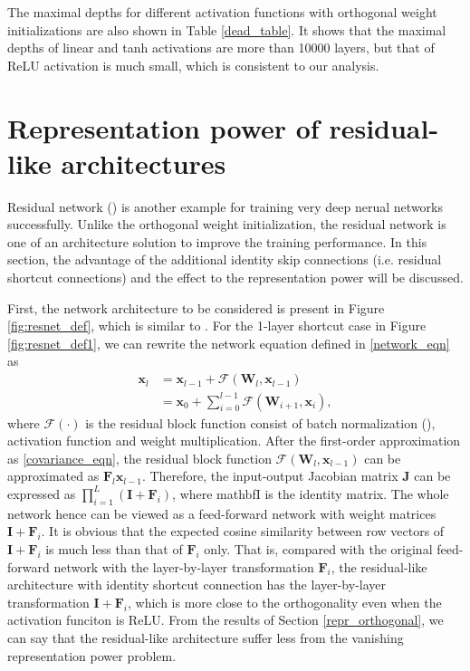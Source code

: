 The maximal depths for different activation functions with orthogonal weight initializations
are also shown in Table \ref{dead_table}. It shows that the maximal depths of linear and tanh
activations are more than 10000 layers, but that of ReLU activation is much small, which is
consistent to our analysis.

\section{Representation power of residual-like architectures} \label{repr_residual}

Residual network (\cite{resnet1, resnet2}) is another example for training very deep nerual
networks successfully.
Unlike the orthogonal weight initialization, the residual network is one of an architecture
solution to improve the training performance. In this section, the advantage of the 
additional identity skip connections (i.e. residual shortcut connections) and the effect
to the representation power will be discussed.

First, the network architecture to be considered is present in Figure \ref{fig:resnet_def}, which is
similar to \cite{resnet2}. For the 1-layer shortcut case in Figure \ref{fig:resnet_def1}, we can
rewrite the network equation defined in \eqref{network_eqn} as
\begin{equation}
    \begin{aligned}
        \mathbf{x}_{l}&=\mathbf{x}_{l-1} + \mathcal{F}(\mathbf{W}_l, \mathbf{x}_{l-1})\\
        &=\mathbf{x}_{0} + \sum_{i=0}^{l-1}\mathcal{F}(\mathbf{W}_{i+1}, \mathbf{x}_{i}),
    \end{aligned}
\label{resnet_eqn}
\end{equation}
where $\mathcal{F}(\cdot)$ is the residual block function consist of batch normalization
(\cite{batchnorm}), activation function and weight multiplication.
After the first-order approximation as \eqref{covariance_eqn}, the residual block function
$\mathcal{F}(\mathbf{W}_l, \mathbf{x}_{l-1})$ can be approximated as $\mathbf{F}_l\mathbf{x}_{l-1}$.
Therefore, the input-output Jacobian matrix $\mathbf{J}$ can be expressed as
$\prod_{i=1}^{L}(\mathbf{I}+\mathbf{F}_i)$, where mathbf{I} is the identity matrix.
The whole network hence can be viewed as a feed-forward network with weight matrices
$\mathbf{I}+\mathbf{F}_i$. It is obvious that the expected cosine similarity between row vectors 
of $\mathbf{I}+\mathbf{F}_i$ is much less than that of $\mathbf{F}_i$ only.
That is, compared with the original feed-forward network with the layer-by-layer transformation
$\mathbf{F}_i$, the residual-like architecture with identity shortcut connection has the
layer-by-layer transformation $\mathbf{I}+\mathbf{F}_i$, which is more close to the orthogonality
even when the activation funciton is ReLU.
From the results of Section \ref{repr_orthogonal}, we can say that the residual-like architecture
suffer less from the vanishing representation power problem.

